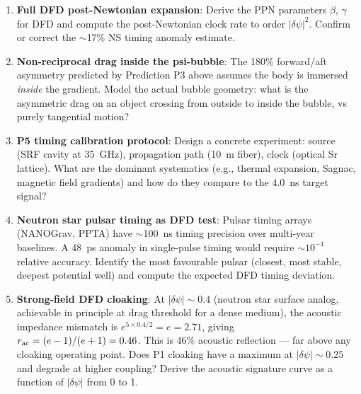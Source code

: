 \documentclass[11pt,twocolumn]{article}
\newcommand{\dpsi}{\delta\psi}
\begin{document}
\begin{enumerate}[nosep, itemsep=4pt]

\item \textbf{Full DFD post-Newtonian expansion}: Derive the PPN parameters
  $\beta$, $\gamma$ for DFD and compute the post-Newtonian clock rate to
  order $|\dpsi|^2$. Confirm or correct the $\sim$17\% NS timing anomaly
  estimate.

\item \textbf{Non-reciprocal drag inside the psi-bubble}: The 180\%
  forward/aft asymmetry predicted by Prediction P3 above assumes the body
  is immersed \emph{inside} the gradient. Model the actual bubble geometry:
  what is the asymmetric drag on an object crossing from outside to inside
  the bubble, vs purely tangential motion?

\item \textbf{P5 timing calibration protocol}: Design a concrete experiment:
  source (SRF cavity at 35~GHz), propagation path (10~m fiber), clock
  (optical Sr lattice). What are the dominant systematics (e.g., thermal
  expansion, Sagnac, magnetic field gradients) and how do they compare
  to the 4.0~ns target signal?

\item \textbf{Neutron star pulsar timing as DFD test}: Pulsar timing arrays
  (NANOGrav, PPTA) have $\sim$100~ns timing precision over multi-year
  baselines. A 48~ps anomaly in single-pulse timing would require $\sim
  10^{-4}$ relative accuracy. Identify the most favourable pulsar (closest,
  most stable, deepest potential well) and compute the expected DFD timing
  deviation.

\item \textbf{Strong-field DFD cloaking}: At $|\dpsi| \sim 0.4$ (neutron
  star surface analog, achievable in principle at drag threshold for a
  dense medium), the acoustic impedance mismatch is $e^{5\times0.4/2}
  = e = 2.71$, giving $r_{\rm ac} = (e-1)/(e+1) = 0.46$. This is 46\%
  acoustic reflection --- far above any cloaking operating point. Does P1
  cloaking have a maximum at $|\dpsi| \sim 0.25$ and degrade at higher
  coupling? Derive the acoustic signature curve as a function of $|\dpsi|$
  from 0 to 1.

\end{enumerate}
\end{document}
